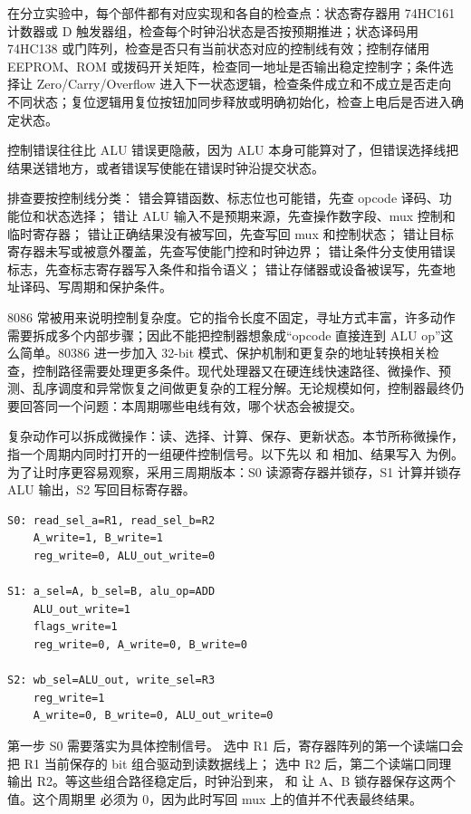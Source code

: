 在分立实验中，每个部件都有对应实现和各自的检查点：状态寄存器用 74HC161 计数器或 D 触发器组，检查每个时钟沿状态是否按预期推进；状态译码用 74HC138 或门阵列，检查是否只有当前状态对应的控制线有效；控制存储用 EEPROM、ROM 或拨码开关矩阵，检查同一地址是否输出稳定控制字；条件选择让 Zero/Carry/Overflow 进入下一状态逻辑，检查条件成立和不成立是否走向不同状态；复位逻辑用复位按钮加同步释放或明确初始化，检查上电后是否进入确定状态。

控制错误往往比 ALU 错误更隐蔽，因为 ALU 本身可能算对了，但错误选择线把结果送错地方，或者错误写使能在错误时钟沿提交状态。

排查要按控制线分类： 错会算错函数、标志位也可能错，先查 opcode 译码、功能位和状态选择； 错让 ALU 输入不是预期来源，先查操作数字段、mux 控制和临时寄存器； 错让正确结果没有被写回，先查写回 mux 和控制状态； 错让目标寄存器未写或被意外覆盖，先查写使能门控和时钟边界； 错让条件分支使用错误标志，先查标志寄存器写入条件和指令语义； 错让存储器或设备被误写，先查地址译码、写周期和保护条件。

8086 常被用来说明控制复杂度。它的指令长度不固定，寻址方式丰富，许多动作需要拆成多个内部步骤；因此不能把控制器想象成“opcode 直接连到 ALU op”这么简单。80386 进一步加入 32-bit 模式、保护机制和更复杂的地址转换相关检查，控制路径需要处理更多条件。现代处理器又在硬连线快速路径、微操作、预测、乱序调度和异常恢复之间做更复杂的工程分解。无论规模如何，控制器最终仍要回答同一个问题：本周期哪些电线有效，哪个状态会被提交。


复杂动作可以拆成微操作：读、选择、计算、保存、更新状态。本节所称微操作，指一个周期内同时打开的一组硬件控制信号。以下先以  和  相加、结果写入  为例。为了让时序更容易观察，采用三周期版本：S0 读源寄存器并锁存，S1 计算并锁存 ALU 输出，S2 写回目标寄存器。

\begin{lstlisting}
S0: read_sel_a=R1, read_sel_b=R2
    A_write=1, B_write=1
    reg_write=0, ALU_out_write=0

S1: a_sel=A, b_sel=B, alu_op=ADD
    ALU_out_write=1
    flags_write=1
    reg_write=0, A_write=0, B_write=0

S2: wb_sel=ALU_out, write_sel=R3
    reg_write=1
    A_write=0, B_write=0, ALU_out_write=0
\end{lstlisting}

第一步 S0 需要落实为具体控制信号。 选中 R1 后，寄存器阵列的第一个读端口会把 R1 当前保存的 bit 组合驱动到读数据线上； 选中 R2 后，第二个读端口同理输出 R2。等这些组合路径稳定后，时钟沿到来， 和  让 A、B 锁存器保存这两个值。这个周期里  必须为 0，因为此时写回 mux 上的值并不代表最终结果。

